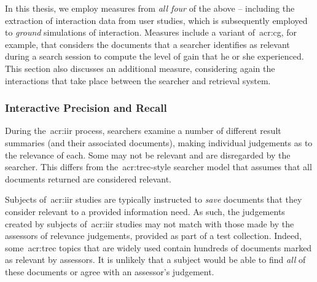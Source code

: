 In this thesis, we employ measures from \emph{all four} of the above -- including the extraction of interaction data from user studies, which is subsequently employed to \emph{ground} simulations of interaction. Measures include a variant of~\gls{acr:cg}, for example, that considers the documents that a searcher identifies as relevant during a search session to compute the level of gain that he or she experienced. This section also discusses an additional measure, considering again the interactions that take place between the searcher and retrieval system.

%
%

\subsubsection{Interactive Precision and Recall}\label{sec:ir_background:evaluation:user:ipr}
During the~\gls{acr:iir} process, searchers examine a number of different result summaries (and their associated documents), making individual judgements as to the relevance of each. Some may not be relevant and are disregarded by the searcher. This differs from the~\gls{acr:trec}-style searcher model that assumes that all documents returned are considered relevant.

Subjects of~\gls{acr:iir} studies are typically instructed to \emph{save} documents that they consider relevant to a provided information need. As such, the judgements created by subjects of~\gls{acr:iir} studies may not match with those made by the assessors of relevance judgements, provided as part of a test collection. Indeed, some~\gls{acr:trec} topics that are widely used contain hundreds of documents marked as relevant by assessors. It is unlikely that a subject would be able to find \emph{all} of these documents or agree with an assessor's judgement.

